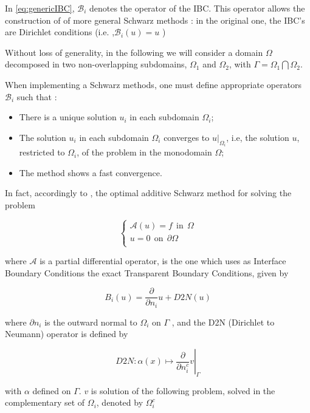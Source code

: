 \indent In \ref{eq:genericIBC}, $\mathcal{B}_i$ denotes the operator of the IBC. This operator allows the construction of of more general Schwarz methods : in the original one, the IBC's are Dirichlet conditions (i.e. ,$\mathcal{B}_i(u) = u$  ) \cite{Japhet2003,LionsI990}

\indent Without loss of generality, in the following we will consider a domain $\Omega$ decomposed in two non-overlapping subdomains, $\Omega_1$ and $\Omega_2$, with $\Gamma = \Omega_1 \bigcap \Omega_2$.

\indent When implementing a Schwarz methods, one must define appropriate operators $\mathcal{B}_i$ such that :

\begin{itemize}
\begingroup \color{red} \item There is a unique solution $u_i$ in each subdomain $\Omega_i$; \endgroup
\item The solution $u_i$ in each subdomain $\Omega_i$ converges to $u|_{\Omega_i}$, i.e, the solution $u$, restricted to $\Omega_i$, of the problem in the monodomain $\Omega$;
\item The method shows a fast convergence.
\end{itemize} 

\indent In fact, accordingly to \cite{Japhet2003}, the optimal additive Schwarz method for solving the problem 

\begin{equation*}
\begin{cases}
\mathcal{A}(u) = f \ \ \text{in} \ \ \Omega\\
u = 0 \ \ \text{on} \ \ \partial\Omega\\
\end{cases}
\end{equation*}

\noindent where $\mathcal{A}$ is a partial differential operator, is the one which uses as Interface Boundary Conditions the exact Transparent Boundary Conditions, given by

$$B_i(u) = \frac{\partial}{\partial n_i}u + D2N(u)$$

\noindent where $\partial n_i$ is the outward normal to $\Omega_i$ on $\Gamma$ , and the D2N (Dirichlet to Neumann) operator is defined by

$$\left. D2N : \alpha(x) \mapsto \frac{\partial}{\partial n_i^c}v \right\rvert_\Gamma$$

\noindent with $\alpha$ defined on $\Gamma$. $v$ is solution of the following problem, solved in the complementary set of $\Omega_i$, denoted by $\Omega_i^c$

